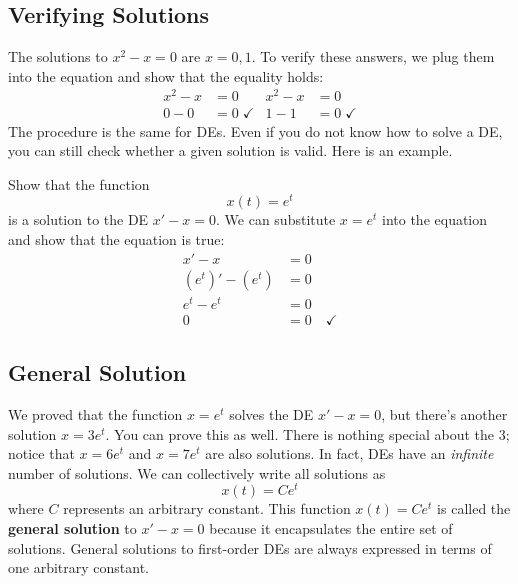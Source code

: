 \documentclass[11pt,letterpaper]{article}
\begin{document}
\subsection{Verifying Solutions}
The solutions to $x^2-x=0$ are $x=0,1$. To verify these answers, we plug them into the equation and show that the equality holds: 
\begin{align*}
    x^2 - x &=0   &  x^2-x&=0\\
    0-0&=0\; \checkmark   &   1-1&=0 \;\checkmark
\end{align*}
The procedure is the same for DEs. Even if you do not know how to solve a DE, you can still check whether a given solution is valid. Here is an example.

\begin{example}[1]{
Show that the function \[x(t)=e^{t}\] 
is a solution to the DE $x'-x=0$. 
}
We can substitute $x=e^{t}$ into the equation and show that the equation is true:
\begin{align*}
    x' - x &=0\\
    (e^t)'-(e^t)&=0\\
    e^t-e^t&=0\\
    0&=0 \quad \checkmark
\end{align*}
\end{example}

\subsection{General Solution}
We proved that the function $x=e^t$ solves the DE $x'-x=0$, but there's another solution $x=3e^{t}$. You can prove this as well.
There is nothing special about the $3$; notice that $x=6e^t$ and $x=7e^t$ are also solutions. In fact, DEs have an \textit{infinite} number of solutions. We can collectively write all solutions as \[x(t) = Ce^{t}\] 
where $C$ represents an arbitrary constant. This function $x(t)=Ce^{t}$ is called the \textbf{general solution} to $x'-x=0$ because it encapsulates the entire set of solutions. General solutions to first-order DEs are always expressed in terms of one arbitrary constant.

\end{document}
